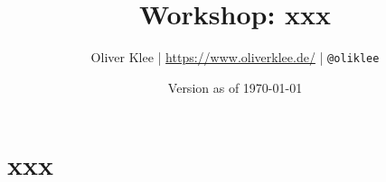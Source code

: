 \documentclass[a4paper,openany,twoside,titlepage,10pt,headsepline]{scrbook}
\author{Oliver Klee | \url{https://www.oliverklee.de/} | \texttt{@oliklee}}
\title{Workshop: xxx}
\date{Version as of \today}
\begin{document}
\frontmatter

\maketitle

\tableofcontents

\mainmatter

\chapter{xxx}






\backmatter
\end{document}
